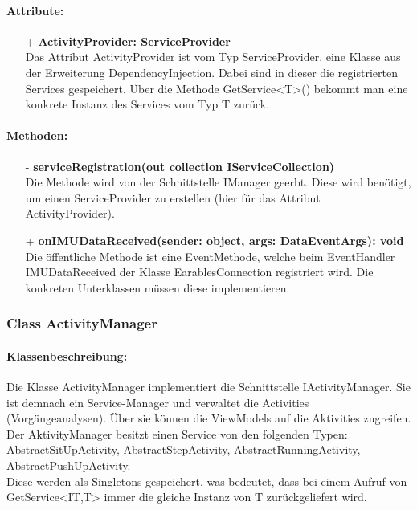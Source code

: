 \documentclass[a4paper,12pt]{article}
\begin{document}
	\paragraph{Attribute:}
	\begin{itemize}
		\item[+] \textbf{ActivityProvider: ServiceProvider}\\Das Attribut ActivityProvider ist vom Typ ServiceProvider, eine Klasse aus der Erweiterung \Gls{DependencyInjection}. Dabei sind in dieser die registrierten Services gespeichert. Über die Methode GetService<T>() bekommt man eine konkrete Instanz des Services vom Typ T zurück. 
	\end{itemize}
	
	\paragraph{Methoden:}
	\begin{itemize}
		\item[-] \textbf{serviceRegistration(out collection IServiceCollection)}\\Die Methode wird von der Schnittstelle IManager geerbt. Diese wird benötigt, um einen ServiceProvider zu erstellen (hier für das Attribut ActivityProvider).
		\item[+] \textbf{onIMUDataReceived(sender: object, args: DataEventArgs): void}\\Die öffentliche Methode ist eine EventMethode, welche beim EventHandler IMUDataReceived der Klasse EarablesConnection registriert wird. Die konkreten Unterklassen müssen diese implementieren. 
	\end{itemize}
	
	\subsubsection{Class ActivityManager}
	\paragraph{Klassenbeschreibung:}
	Die Klasse ActivityManager implementiert die Schnittstelle IActivityManager. Sie ist demnach ein Service-Manager und verwaltet die Activities (Vorgängeanalysen). Über sie können die ViewModels auf die Aktivities zugreifen.\\
	Der AktivityManager besitzt einen Service von den folgenden Typen: AbstractSitUpActivity, AbstractStepActivity, AbstractRunningActivity, AbstractPushUpActivity.\\
	Diese werden als Singletons gespeichert, was bedeutet, dass bei einem Aufruf von GetService<IT,T> immer die gleiche Instanz von T zurückgeliefert wird.
	
\end{document}
